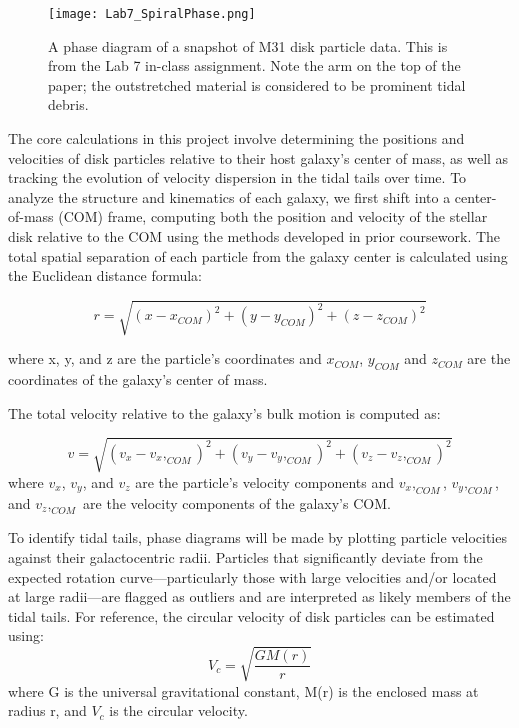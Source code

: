\documentclass[fleqn,usenatbib]{mnras}
\begin{document}
\begin{figure}
    \centering
    \texttt{[image: Lab7\_SpiralPhase.png]}
    \caption{A phase diagram of a snapshot of M31 disk particle data. This is from the Lab 7 in-class assignment. Note the arm on the top of the paper; the outstretched material is considered to be prominent tidal debris.}
    \label{fig:enter-label}
\end{figure}

The core calculations in this project involve determining the positions and velocities of disk particles relative to their host galaxy's center of mass, as well as tracking the evolution of velocity dispersion in the tidal tails over time. To analyze the structure and kinematics of each galaxy, we first shift into a center-of-mass (COM) frame, computing both the position and velocity of the stellar disk relative to the COM using the methods developed in prior coursework. The total spatial separation of each particle from the galaxy center is calculated using the Euclidean distance formula:

\begin{equation}
    r = \sqrt{(x-x_{COM})^2 + (y-y_{COM})^2+ (z-z_{COM})^2}  
\end{equation}

where x,  y, and z are the particle’s coordinates and $x_{COM}$, $y_{COM}$ and $z_{COM}$ are the coordinates of the galaxy’s center of mass.

The total velocity relative to the galaxy's bulk motion is computed as:

\begin{equation}
    v = \sqrt{(v_x-v_x,_{COM})^2 + (v_y-v_y,_{COM})^2+ (v_z-v_z,_{COM})^2}  
\end{equation}
where $v_x$, $v_y$, and $v_z$ are the particle’s velocity components and $v_x,_{COM}$,  $v_y,_{COM}$, and $v_z,_{COM}$ are the velocity components of the galaxy’s COM. 

To identify tidal tails, phase diagrams will be made by plotting particle velocities against their galactocentric radii. Particles that significantly deviate from the expected rotation curve—particularly those with large velocities and/or located at large radii—are flagged as outliers and are interpreted as likely members of the tidal tails. For reference, the circular velocity of disk particles can be estimated using:
\begin{equation}
    V_c=\sqrt{\frac{GM(r)}{r}}
\end{equation}
where G is the universal gravitational constant, M(r) is the enclosed mass at radius r, and $V_c$ is the circular velocity. 
\end{document}
